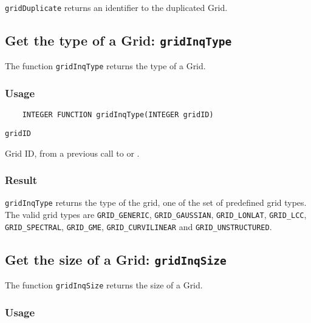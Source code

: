 {\tt gridDuplicate} returns an identifier to the duplicated Grid.



\subsection{Get the type of a Grid: {\tt gridInqType}}
\label{gridInqType}

The function {\tt gridInqType} returns the type of a Grid.

\subsubsection*{Usage}

\begin{verbatim}
    INTEGER FUNCTION gridInqType(INTEGER gridID)
\end{verbatim}

\hspace*{4mm}\begin{minipage}[]{15cm}
\begin{deflist}{\tt gridID\ }
\item[{\tt gridID}]
Grid ID, from a previous call to {} or {}.

\end{deflist}
\end{minipage}

\subsubsection*{Result}

{\tt gridInqType} returns the type of the grid,
one of the set of predefined {\CDI} grid types.
The valid {\CDI} grid types are {\tt GRID\_GENERIC}, {\tt GRID\_GAUSSIAN},
{\tt GRID\_LONLAT}, {\tt GRID\_LCC}, {\tt GRID\_SPECTRAL}, {\tt GRID\_GME},
{\tt GRID\_CURVILINEAR} and {\tt GRID\_UNSTRUCTURED}.



\subsection{Get the size of a Grid: {\tt gridInqSize}}
\label{gridInqSize}

The function {\tt gridInqSize} returns the size of a Grid.

\subsubsection*{Usage}

